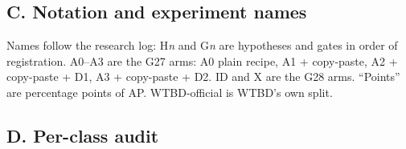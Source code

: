 \documentclass[
  10pt,
]{article}
\begin{document}
\subsection*{C. Notation and experiment
names}\label{c.-notation-and-experiment-names}

Names follow the research log: H\emph{n} and G\emph{n} are hypotheses
and gates in order of registration. A0--A3 are the G27 arms: A0 plain
recipe, A1 + copy-paste, A2 + copy-paste + D1, A3 + copy-paste + D2. ID
and X are the G28 arms. ``Points'' are percentage points of AP.
WTBD-official is WTBD's own split.

\subsection*{D. Per-class audit}\label{d.-per-class-audit}
\end{document}
